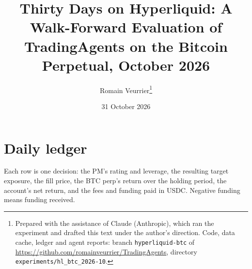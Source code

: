 \documentclass[11pt]{article}
\title{\textbf{Thirty Days on Hyperliquid: A Walk-Forward Evaluation of TradingAgents on the Bitcoin Perpetual, October 2026}}
\author{Romain Veurrier\thanks{Prepared with the assistance of Claude (Anthropic), which ran the experiment and drafted this text under the author's direction. Code, data cache, ledger and agent reports: branch \texttt{hyperliquid-btc} of \url{https://github.com/romainveurrier/TradingAgents}, directory \texttt{experiments/hl\_btc\_2026-10}.}}
\date{31 October 2026}
\begin{document}
\maketitle









\appendix
\section{Daily ledger}\label{app:ledger}
Each row is one decision: the PM's rating and leverage, the resulting target exposure, the fill price, the BTC perp's return over the holding period, the account's net return, and the fees and funding paid in USDC. Negative funding means funding received.
{\small}
\end{document}
